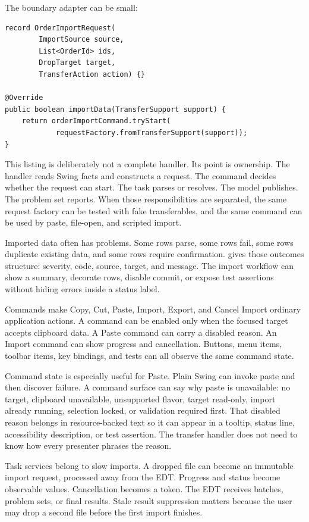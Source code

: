 The boundary adapter can be small:

\begin{lstlisting}[caption={A transfer handler creating an application import request.}]
record OrderImportRequest(
        ImportSource source,
        List<OrderId> ids,
        DropTarget target,
        TransferAction action) {}

@Override
public boolean importData(TransferSupport support) {
    return orderImportCommand.tryStart(
            requestFactory.fromTransferSupport(support));
}
\end{lstlisting}

This listing is deliberately not a complete handler. Its point is ownership. The handler reads Swing facts and constructs a request. The command decides whether the request can start. The task parses or resolves. The model publishes. The problem set reports. When those responsibilities are separated, the same request factory can be tested with fake transferables, and the same command can be used by paste, file-open, and scripted import.

Imported data often has problems. Some rows parse, some rows fail, some rows duplicate existing data, and some rows require confirmation.  gives those outcomes structure: severity, code, source, target, and message. The import workflow can show a summary, decorate rows, disable commit, or expose test assertions without hiding errors inside a status label.

Commands make Copy, Cut, Paste, Import, Export, and Cancel Import ordinary application actions. A command can be enabled only when the focused target accepts clipboard data. A Paste command can carry a disabled reason. An Import command can show progress and cancellation. Buttons, menu items, toolbar items, key bindings, and tests can all observe the same command state.

Command state is especially useful for Paste. Plain Swing can invoke paste and then discover failure. A command surface can say why paste is unavailable: no target, clipboard unavailable, unsupported flavor, target read-only, import already running, selection locked, or validation required first. That disabled reason belongs in resource-backed text so it can appear in a tooltip, status line, accessibility description, or test assertion. The transfer handler does not need to know how every presenter phrases the reason.

Task services belong to slow imports. A dropped file can become an immutable import request, processed away from the EDT. Progress and status become observable values. Cancellation becomes a token. The EDT receives batches, problem sets, or final results. Stale result suppression matters because the user may drop a second file before the first import finishes.

